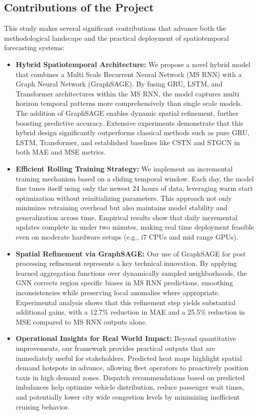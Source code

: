 \documentclass{article}
\begin{document}
\subsection{Contributions of the Project}

This study makes several significant contributions that advance both the methodological landscape and the practical deployment of spatiotemporal forecasting systems:

\begin{itemize}
  \item \textbf{Hybrid Spatiotemporal Architecture:}  
  We propose a novel hybrid model that combines a Multi Scale Recurrent Neural Network (MS RNN) with a Graph Neural Network (GraphSAGE). By fusing GRU, LSTM, and Transformer architectures within the MS RNN, the model captures multi horizon temporal patterns more comprehensively than single scale models. The addition of GraphSAGE enables dynamic spatial refinement, further boosting predictive accuracy. Extensive experiments demonstrate that this hybrid design significantly outperforms classical methods such as pure GRU, LSTM, Transformer, and established baselines like CSTN and STGCN in both MAE and MSE metrics.
  
  \item \textbf{Efficient Rolling Training Strategy:}  
  We implement an incremental training mechanism based on a sliding temporal window. Each day, the model fine tunes itself using only the newest 24 hours of data, leveraging warm start optimization without reinitializing parameters. This approach not only minimizes retraining overhead but also maintains model stability and generalization across time. Empirical results show that daily incremental updates complete in under two minutes, making real time deployment feasible even on moderate hardware setups (e.g., i7 CPUs and mid range GPUs).
  
  \item \textbf{Spatial Refinement via GraphSAGE:}  
  Our use of GraphSAGE for post processing refinement represents a key technical innovation. By applying learned aggregation functions over dynamically sampled neighborhoods, the GNN corrects region specific biases in MS RNN predictions, smoothing inconsistencies while preserving local anomalies where appropriate. Experimental analysis shows that this refinement step yields substantial additional gains, with a 12.7\% reduction in MAE and a 25.5\% reduction in MSE compared to MS RNN outputs alone.
  
  \item \textbf{Operational Insights for Real World Impact:}  
  Beyond quantitative improvements, our framework provides practical outputs that are immediately useful for stakeholders. Predicted heat maps highlight spatial demand hotspots in advance, allowing fleet operators to proactively position taxis in high demand zones. Dispatch recommendations based on predicted imbalances help optimize vehicle distribution, reduce passenger wait times, and potentially lower city wide congestion levels by minimizing inefficient cruising behavior.
  

\end{itemize}
\end{document}

